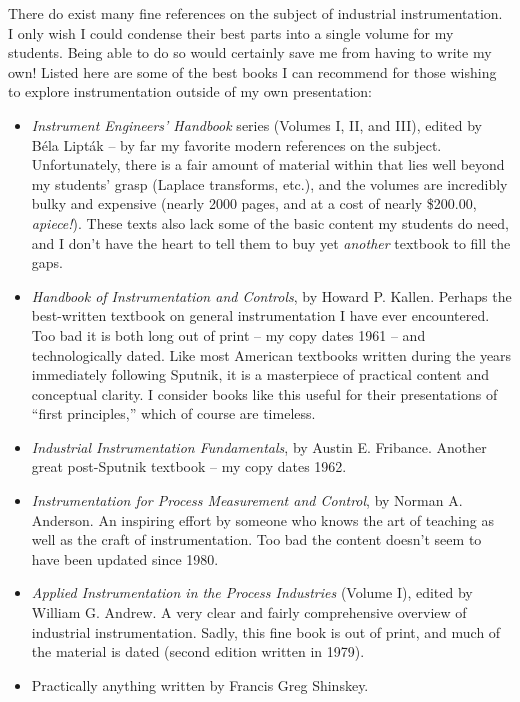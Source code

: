 There do exist many fine references on the subject of industrial instrumentation.  I only wish I could condense their best parts into a single volume for my students.  Being able to do so would certainly save me from having to write my own!  Listed here are some of the best books I can recommend for those wishing to explore instrumentation outside of my own presentation:

\begin{itemize}
\item \textit{Instrument Engineers' Handbook} series (Volumes I, II, and III), edited by B\'ela Lipt\'ak -- by far my favorite modern references on the subject.  Unfortunately, there is a fair amount of material within that lies well beyond my students' grasp (Laplace transforms, etc.), and the volumes are incredibly bulky and expensive (nearly 2000 pages, and at a cost of nearly \$200.00, \textit{apiece!}).  These texts also lack some of the basic content my students do need, and I don't have the heart to tell them to buy yet \textit{another} textbook to fill the gaps.  
\item \textit{Handbook of Instrumentation and Controls}, by Howard P. Kallen.  Perhaps the best-written textbook on general instrumentation I have ever encountered.  Too bad it is both long out of print -- my copy dates 1961 -- and technologically dated.  Like most American textbooks written during the years immediately following Sputnik, it is a masterpiece of practical content and conceptual clarity.  I consider books like this useful for their presentations of ``first principles,'' which of course are timeless.  
\item \textit{Industrial Instrumentation Fundamentals}, by Austin E. Fribance.  Another great post-Sputnik textbook -- my copy dates 1962.  
\item \textit{Instrumentation for Process Measurement and Control}, by Norman A. Anderson.  An inspiring effort by someone who knows the art of teaching as well as the craft of instrumentation.  Too bad the content doesn't seem to have been updated since 1980.  
\item \textit{Applied Instrumentation in the Process Industries} (Volume I), edited by William G. Andrew.  A very clear and fairly comprehensive overview of industrial instrumentation.  Sadly, this fine book is out of print, and much of the material is dated (second edition written in 1979). 
\item Practically anything written by Francis Greg Shinskey.  
\end{itemize}


